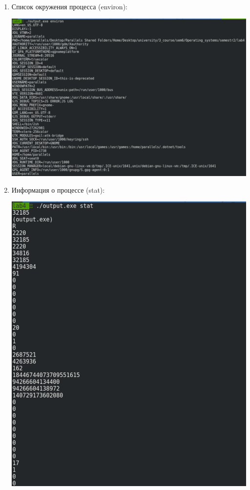 \documentclass[a4paper,14pt]{extreport} %
\begin{document}
\begin{enumerate}
\item Список окружения процесса (environ):

\includegraphics[scale=0.45]{images/environ}

\item Информация о процессе (stat):

\includegraphics[scale=0.45]{images/stat}


\end{enumerate}
\end{document}
